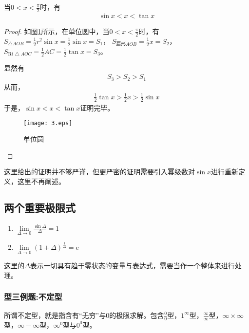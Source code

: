     当$ 0<x<\displaystyle\frac{\pi}{2} $时，有
    \begin{align*}
        \sin x<x<\tan x
    \end{align*}
        \begin{proof}
        如图\ref{dwy}所示，在单位圆中，当$ 0<x<\displaystyle\frac{\pi}{2}$时，有
        $S_{\bigtriangleup AOB}=\displaystyle\frac{1}{2}r^2 \sin x=\displaystyle\frac{1}{2}\sin x=S_1$， 
        $S_{\text{扇形} AOB}=\displaystyle\frac{1}{2}x=S_2$， 
        $S_{\mathrm{Rt} \bigtriangleup AOC}=\displaystyle\frac{1}{2}AC=\displaystyle\frac{1}{2}\tan x=S_3$。
        
        显然有
        \begin{align*}
            S_3>S_2>S_1
        \end{align*}
        从而，
        \begin{align*}
            \frac{1}{2}\tan x>\frac{1}{2}x>\frac{1}{2}\sin x
        \end{align*}
        于是，$\sin x<x<\tan x$证明完毕。
        \begin{figure}[htbp]
            \centering
            \texttt{[image: 3.eps]}
            \caption{单位圆}
            \label{dwy}
          \end{figure}
        \end{proof}
        \begin{note}
            这里给出的证明并不够严谨，但更严密的证明需要引入幂级数对$\sin x$进行重新定义，这里不再阐述。
        \end{note}
        
        \subsection{两个重要极限式}
        \begin{enumerate}
            \item $\lim\limits_{\Delta \to 0} \frac{\sin \Delta}{\Delta}=1$
            \item $\lim\limits_{\Delta \to 0} (1+\Delta)^{\frac{1}{\Delta}}=\mathrm{e}$
        \end{enumerate}
        \begin{note}
            这里的$\Delta$表示一切具有趋于零状态的变量与表达式，需要当作一个整体来进行处理。
        \end{note}

        \subsubsection*{型三例题:不定型}
        所谓不定型，就是指含有“无穷”与0的极限求解。包含$ 
        \frac{0}{0} $型，$ 1^{\infty} $型，$ 
        \frac{\infty}{\infty} $型，$ 
        \infty \times \infty $型，$ 
        \infty - \infty $型，$ 
        \infty^{0} $型与$0^{0} $型。

